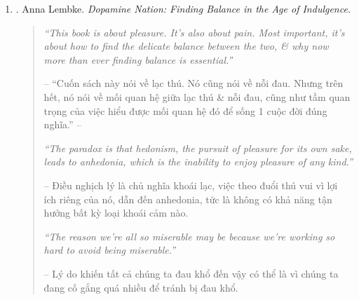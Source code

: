\documentclass{article}
\begin{document}
\begin{enumerate}
	{\sf Editorial reviews.}
	\begin{itemize}
		\item ``Whether religious or not, this book will speak because it touches -- profoundly, but simply -- on questions no parent \& no person can avoid.'' -- {\sc Harvey Cox}, Harvard Divinity School
		\item ``{\it When Bad Things Happen to Good People} offers a moving \& humane approach to understanding life's windstorms.'' -- {\sc Elisabeth KŸbler-Ross}
		\item ``A touching, heartwarming book for those of us who must content with suffering, \& that, of course, is all of us.'' -- {\sc Andrew M. Greeley}
		\item ``This is a book all humanity needs. It will help you understand the painful vicissitudes of this life \& enable you to stand up to them creatively.'' -- {\sc Norman Vincent Peale}
	\end{itemize}
	{\sf About the Author.} {\sc Harold S. Kushner} is rabbi laureate of Temple Israel in Natick, Massachusetts, having long served that congregation. He is best known as the author of {\it When Bad Things Happen to Good People}.

	\item \cite{Lembke_dopamine}. {\sc Anna Lembke}. {\it Dopamine Nation: Finding Balance in the Age of Indulgence}.\hfill{\sf[reading]}
	\begin{quotation}
		{\it``This book is about pleasure. It's also about pain. Most important, it's about how to find the delicate balance between the two, \& why now more than ever finding balance is essential.''}

		-- ``Cuốn sách này nói về lạc thú. Nó cũng nói về nỗi đau. Nhưng trên hết, nó nói về mối quan hệ giữa lạc thú \& nỗi đau, cũng như tầm quan trọng của việc hiểu được mối quan hệ đó để sống 1 cuộc đời đúng nghĩa.'' -- \cite[p. 9]{Lembke_dopamine_VN}

		{\it``The paradox is that hedonism, the pursuit of pleasure for its own sake, leads to anhedonia, which is the inability to enjoy pleasure of any kind.''}

		-- Điều nghịch lý là chủ nghĩa khoái lạc, việc theo đuổi thú vui vì lợi ích riêng của nó, dẫn đến anhedonia, tức là không có khả năng tận hưởng bất kỳ loại khoái cảm nào.

		{\it``The reason we're all so miserable may be because we're working so hard to avoid being miserable.''}

		-- Lý do khiến tất cả chúng ta đau khổ đến vậy có thể là vì chúng ta đang cố gắng quá nhiều để tránh bị đau khổ.


\end{quotation}
\end{enumerate}
\end{document}
